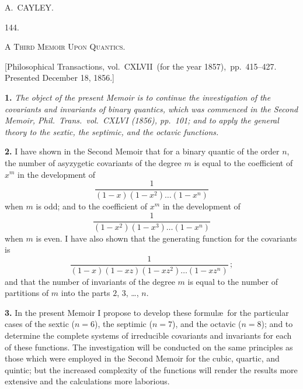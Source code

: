 \documentclass[11pt,a4paper]{book}
\begin{document}
\vspace{3ex}
\begin{flushright}
A.\ CAYLEY.
\end{flushright}


\clearpage
\setcounter{page}{311}

\begin{center}
\textsc{144.}
\end{center}

\begin{center}
\textsc{A Third Memoir Upon Quantics.}
\end{center}

\begin{center}
[Philosophical Transactions, vol.\ CXLVII\ (for the year 1857),\ pp.\ 415--427.\\
Presented December 18, 1856.]
\end{center}

\textbf{1.} \textit{The object of the present Memoir is to continue the investigation of the covariants and invariants of binary quantics, which was commenced in the Second Memoir, Phil.\ Trans.\ vol.\ CXLVI (1856), pp.\ 101; and to apply the general theory to the sextic, the septimic, and the octavic functions.}

\textbf{2.} I have shown in the Second Memoir that for a binary quantic of the order $n$, the number of asyzygetic covariants of the degree $m$ is equal to the coefficient of $x^{m}$ in the development of
\[
\frac{1}{(1-x)(1-x^{2})\ldots(1-x^{n})}
\]
when $m$ is odd; and to the coefficient of $x^{m}$ in the development of
\[
\frac{1}{(1-x^{2})(1-x^{3})\ldots(1-x^{n})}
\]
when $m$ is even. I have also shown that the generating function for the covariants is
\[
\frac{1}{(1-x)(1-xz)(1-xz^{2})\ldots(1-xz^{n})}\,;
\]
and that the number of invariants of the degree $m$ is equal to the number of partitions of $m$ into the parts $2$, $3$, \ldots, $n$.

\textbf{3.} In the present Memoir I propose to develop these formul\ae\ for the particular cases of the sextic ($n=6$), the septimic ($n=7$), and the octavic ($n=8$); and to determine the complete systems of irreducible covariants and invariants for each of these functions. The investigation will be conducted on the same principles as those which were employed in the Second Memoir for the cubic, quartic, and quintic; but the increased complexity of the functions will render the results more extensive and the calculations more laborious.
\end{document}
